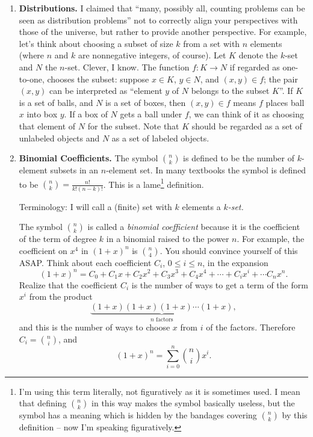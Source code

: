 \documentclass[10pt, AMS Euler]{article}
\begin{document}
\begin{enumerate}

\item {\bf Distributions.}  I claimed that ``many, possibly all, counting problems can be seen as distribution problems'' not to 
correctly align your perspectives with those of the universe, but rather to provide another perspective.  
For example, let's think about choosing a subset of size $k$ from a set with $n$ elements (where $n$ and 
$k$ are nonnegative integers, of course).  Let $K$ denote the $k$-set and $N$ the $n$-set.  Clever, I know.  
The function $f:K \to N$ if regarded as one-to-one, chooses the subset: suppose $x \in K$, $y \in N$, and $(x,y) \in f$; 
the pair $(x,y)$ can be interpreted as ``element $y$ of $N$ belongs to the subset $K$''.  If $K$ is a set of balls, and $N$ is a set of 
boxes, then $(x,y)\in f$ means $f$ places ball $x$ into box $y$.  If a box of $N$ gets a ball under $f$, we can think of it as choosing that element of 
$N$ for the subset.  Note that $K$ should be regarded as a set of unlabeled objects and $N$ as a set of labeled objects. 

\item {\bf Binomial Coefficients.} The symbol $\binom{n}{k}$ is defined to be the number of $k$-element subsets
in an $n$-element set.
In many textbooks the symbol is defined to be $\binom{n}{k} = \frac{n!}{k!(n-k)!}$.
This is a lame\footnote{I'm using this term literally, not figuratively as it is sometimes used.
I mean that defining $\binom{n}{k}$ in this way makes the symbol basically useless, but the symbol has a meaning which is
hidden by the bandages covering $\binom{n}{k}$ by this definition -- now I'm speaking figuratively.} definition.

\textsf{Terminology:} I will call a (finite) set with $k$ elements a \emph{$k$-set.}

The symbol $\binom{n}{k}$ is called a \emph{binomial coefficient} because it is the coefficient of the term of degree $k$ in a binomial raised
to the power $n$.  For example, the coefficient on $x^4$ in $(1+x)^n$ is $\binom{n}{4}$.  You should convince yourself of this ASAP. 
Think about each coefficient $C_i$, $0 \leq i \leq n$, in the expansion
$$(1+x)^n = C_0 + C_1x +C_2 x^2 + C_3x^3 +C_4 x^4 + \cdots + C_ix^i + \cdots C_nx^n.$$
Realize that the coefficient $C_i$ is the number of ways to get a term of the form $x^i$ from the product
$$\underbrace{(1+x)(1+x)(1+x) \cdots (1+x)}_{\mbox{$n$ factors}},$$
and this is the number of ways to choose $x$ from $i$ of the factors.  Therefore $C_i = \binom{n}{i}$, and 
$$(1+x)^n = \sum_{i = 0}^n\binom{n}{i}x^i.$$


\end{enumerate}
\end{document}

